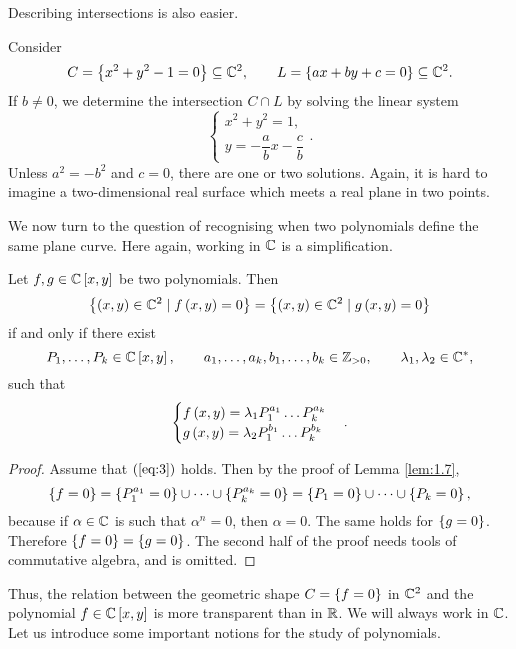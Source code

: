 Describing intersections is also easier.

\begin{example}
Consider
$$ C = \left\{ x^2 + y^2 - 1 = 0 \right\} \subseteq \mathbb{C}^2, \qquad L = \left\{ ax + by + c = 0 \right\} \subseteq \mathbb{C}^2. $$
If $ b \ne 0 $, we determine the intersection $ C \cap L $ by solving the linear system
$$
\begin{cases}
x^2 + y^2 = 1, \\
y = -\dfrac{a}{b}x - \dfrac{c}{b}
\end{cases}.
$$
Unless $ a^2 = -b^2 $ and $ c = 0 $, there are one or two solutions. Again, it is hard to imagine a two-dimensional real surface which meets a real plane in two points.
\end{example}

\pagebreak

We now turn to the question of recognising when two polynomials define the same plane curve. Here again, working in $ \mathbb{C} $ is a simplification.

\begin{theorem}
\label{thm:2.10}
Let $ f, g \in \mathbb{C}\left[ x, y \right] $ be two polynomials. Then
$$ \left\{ \left( x, y \right) \in \mathbb{C}^2 \mid f\left( x, y \right) = 0 \right\} = \left\{ \left( x, y \right) \in \mathbb{C}^2 \mid g\left( x, y \right) = 0 \right\} $$
if and only if there exist
$$ P_1, \dots, P_k \in \mathbb{C}\left[ x, y \right], \qquad a_1, \dots, a_k, b_1, \dots, b_k \in \mathbb{Z}_{> 0}, \qquad \lambda_1, \lambda_2 \in \mathbb{C}^*, $$
such that
\begin{equation}
\label{eq:3}
\begin{cases}
f\left( x, y \right) = \lambda_1 P_1^{a_1} \dots P_k^{a_k} \\
g\left( x, y \right) = \lambda_2 P_1^{b_1} \dots P_k^{b_k}
\end{cases}.
\end{equation}
\end{theorem}


\begin{proof}
Assume that $ \left( \ref{eq:3} \right) $ holds. Then by the proof of Lemma \ref{lem:1.7},
$$ \left\{ f = 0 \right\} = \left\{ P_1^{a_1} = 0 \right\} \cup \dots \cup \left\{ P_k^{a_k} = 0 \right\} = \left\{ P_1 = 0 \right\} \cup \dots \cup \left\{ P_k = 0 \right\}, $$
because if $ \alpha \in \mathbb{C} $ is such that $ \alpha^n = 0 $, then $ \alpha = 0 $. The same holds for $ \left\{ g = 0 \right\} $. Therefore $ \left\{ f = 0 \right\} = \left\{ g = 0 \right\} $. The second half of the proof needs tools of commutative algebra, and is omitted.
\end{proof}

Thus, the relation between the geometric shape $ C = \left\{ f = 0 \right\} $ in $ \mathbb{C}^2 $ and the polynomial $ f \in \mathbb{C}\left[ x, y \right] $ is more transparent than in $ \mathbb{R} $. We will always work in $ \mathbb{C} $. Let us introduce some important notions for the study of polynomials.

